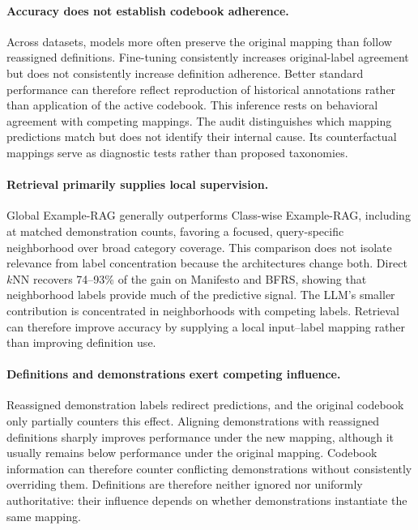 \documentclass[11pt]{article}
\begin{document}
\paragraph{Accuracy does not establish codebook adherence.}
Across datasets, models more often preserve the original mapping than follow reassigned definitions. Fine-tuning consistently increases original-label agreement but does
not consistently increase definition adherence. Better standard performance can therefore reflect reproduction of historical annotations rather than application of the active codebook. This inference rests on behavioral agreement with competing mappings. The audit distinguishes which mapping predictions match but does not identify their internal cause. Its counterfactual mappings serve as diagnostic tests rather than proposed taxonomies.


\paragraph{Retrieval primarily supplies local supervision.}
Global Example-RAG generally outperforms Class-wise Example-RAG, including at matched demonstration counts, favoring a focused, query-specific neighborhood over broad category coverage. This comparison does not isolate relevance from label concentration because the architectures change both. Direct \(k\)NN recovers 74--93\% of the gain on Manifesto and BFRS, showing that neighborhood labels provide much of the predictive signal. The LLM's smaller contribution is concentrated in neighborhoods with competing labels. Retrieval can therefore improve accuracy by supplying a local input--label mapping rather than improving definition use.

\paragraph{Definitions and demonstrations exert competing influence.}
Reassigned demonstration labels redirect predictions, and the original codebook only partially counters this effect. Aligning
demonstrations with reassigned definitions sharply improves performance under the new mapping, although it usually remains below performance under the original mapping. Codebook information can therefore counter conflicting demonstrations without consistently overriding them. Definitions are therefore neither ignored nor uniformly authoritative: their influence depends on whether demonstrations instantiate the same mapping.
\end{document}
